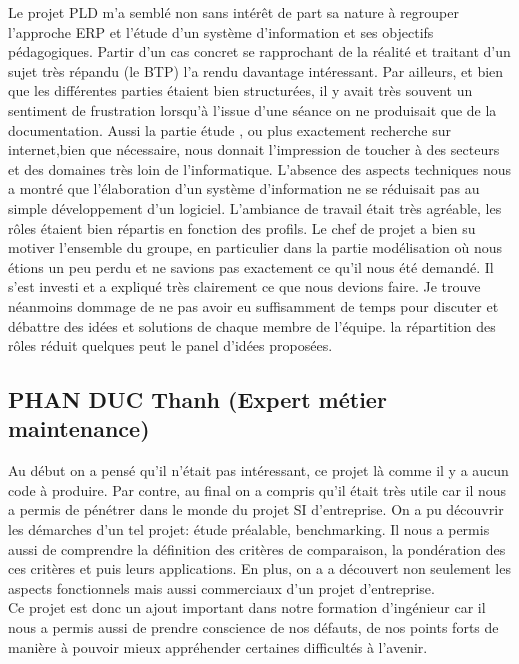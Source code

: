 Le projet PLD m'a semblé non sans intérêt de part sa nature à regrouper l'approche ERP et l'étude d'un système d'information et ses objectifs pédagogiques.
Partir d'un cas concret se rapprochant de la réalité et traitant d'un sujet très répandu (le BTP) l'a rendu davantage intéressant. Par ailleurs, et bien que
les différentes parties étaient bien structurées, il y avait très souvent un sentiment de frustration lorsqu'à l'issue d'une séance on ne produisait que de la documentation. Aussi la partie étude , ou plus exactement recherche sur internet,bien que nécessaire, nous donnait l'impression de toucher à des secteurs et des domaines très loin de l'informatique. 
L'absence des aspects techniques nous a montré que l'élaboration d'un système d'information ne se réduisait pas au simple développement d'un logiciel. 
L'ambiance de travail était très agréable, les rôles étaient bien répartis en fonction des profils. Le chef de projet a bien su motiver l'ensemble du groupe, en particulier dans la partie modélisation où nous étions un peu perdu et ne savions pas exactement ce qu'il nous été demandé. Il s'est investi et a expliqué très clairement ce que nous devions faire.
Je trouve néanmoins dommage de ne pas avoir eu suffisamment de temps pour discuter et débattre des idées et solutions de chaque membre de l'équipe. la répartition des rôles réduit quelques peut le panel d'idées proposées. 

       \subsection{PHAN DUC Thanh (Expert métier maintenance)}

Au début on a pensé qu'il n'était pas intéressant, ce projet là comme il y a aucun code à produire. Par  contre, au final on a compris qu'il était très utile car il nous a permis de pénétrer dans le monde du projet SI d'entreprise. On a pu découvrir les démarches d'un tel projet: étude préalable, benchmarking. Il nous a permis aussi de comprendre la définition des critères de comparaison, la pondération des ces critères et puis leurs applications.  En plus, on a a découvert non seulement les aspects fonctionnels mais aussi commerciaux d'un projet d'entreprise.\\

Ce projet est donc un ajout important dans notre formation d'ingénieur car il nous a permis aussi de prendre conscience de nos défauts, de nos points forts de manière à pouvoir mieux appréhender certaines difficultés à l'avenir. 


